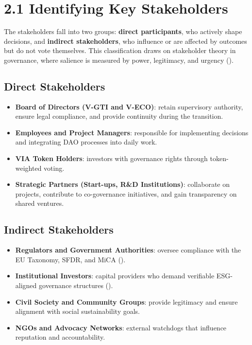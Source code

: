 \documentclass[
  english,
  12pt,
  oneside,
  open=any]{scrbook}
\providecommand{\tightlist}{%
  \setlength{\itemsep}{0pt}\setlength{\parskip}{0pt}}\usepackage{longtable,booktabs,array}
\begin{document}
\section{2.1 Identifying Key Stakeholders}\label{sec-stakeholders}

The stakeholders fall into two groups: \textbf{direct participants}, who
actively shape decisions, and \textbf{indirect stakeholders}, who
influence or are affected by outcomes but do not vote themselves. This
classification draws on stakeholder theory in governance, where salience
is measured by power, legitimacy, and urgency
().

\subsection{Direct Stakeholders}\label{direct-stakeholders}

\begin{itemize}
\tightlist
\item
  \textbf{Board of Directors (V-GTI and V-ECO)}: retain supervisory
  authority, ensure legal compliance, and provide continuity during the
  transition.\\
\item
  \textbf{Employees and Project Managers}: responsible for implementing
  decisions and integrating DAO processes into daily work.\\
\item
  \textbf{VIA Token Holders}: investors with governance rights through
  token-weighted voting.\\
\item
  \textbf{Strategic Partners (Start-ups, R\&D Institutions)}:
  collaborate on projects, contribute to co-governance initiatives, and
  gain transparency on shared ventures.
\end{itemize}

\subsection{Indirect Stakeholders}\label{indirect-stakeholders}

\begin{itemize}
\tightlist
\item
  \textbf{Regulators and Government Authorities}: oversee compliance
  with the EU Taxonomy, SFDR, and MiCA
  ().\\
\item
  \textbf{Institutional Investors}: capital providers who demand
  verifiable ESG-aligned governance structures
  ().\\
\item
  \textbf{Civil Society and Community Groups}: provide legitimacy and
  ensure alignment with social sustainability goals.\\
\item
  \textbf{NGOs and Advocacy Networks}: external watchdogs that influence
  reputation and accountability.
\end{itemize}
\end{document}
